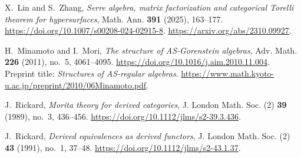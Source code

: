 X.~Lin and S.~Zhang,
\emph{Serre algebra, matrix factorization and categorical Torelli theorem for hypersurfaces},
Math. Ann. \textbf{391} (2025), 163--177.
\url{https://doi.org/10.1007/s00208-024-02915-8}.
\url{https://arxiv.org/abs/2310.09927}.

H.~Minamoto and I.~Mori,
\emph{The structure of AS-Gorenstein algebras},
Adv. Math. \textbf{226} (2011), no.~5, 4061--4095.
\url{https://doi.org/10.1016/j.aim.2010.11.004}.
Preprint title: \emph{Structures of AS-regular algebras}.
\url{https://www.math.kyoto-u.ac.jp/preprint/2010/06Minamoto.pdf}.

J.~Rickard, \emph{Morita theory for derived categories},
J. London Math. Soc. (2) \textbf{39} (1989), no.~3, 436--456.
\url{https://doi.org/10.1112/jlms/s2-39.3.436}.

J.~Rickard, \emph{Derived equivalences as derived functors},
J. London Math. Soc. (2) \textbf{43} (1991), no.~1, 37--48.
\url{https://doi.org/10.1112/jlms/s2-43.1.37}.
